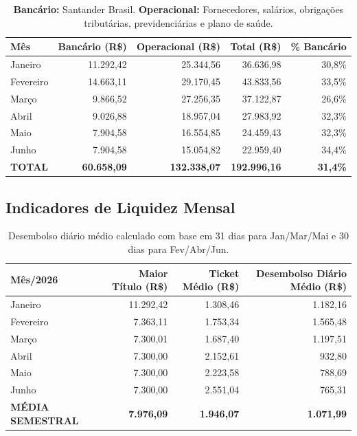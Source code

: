 \documentclass[12pt, a4paper]{article}
\begin{document}
\begin{table}[H]
    \centering
    \renewcommand{\arraystretch}{1.4}
    \begin{tabularx}{\textwidth}{X r r r r}
        \toprule
        \rowcolor{tableHeader} \textbf{Mês} & \textbf{Bancário (R\$)} & \textbf{Operacional (R\$)} & \textbf{Total (R\$)} & \textbf{\% Bancário} \\
        \midrule
        Janeiro & 11.292,42 & 25.344,56 & 36.636,98 & 30,8\% \\
        Fevereiro & 14.663,11 & 29.170,45 & 43.833,56 & 33,5\% \\
        Março & 9.866,52 & 27.256,35 & 37.122,87 & 26,6\% \\
        Abril & 9.026,88 & 18.957,04 & 27.983,92 & 32,3\% \\
        Maio & 7.904,58 & 16.554,85 & 24.459,43 & 32,3\% \\
        Junho & 7.904,58 & 15.054,82 & 22.959,40 & 34,4\% \\
        \midrule
        \rowcolor{lightGray} \textbf{TOTAL} & \textbf{60.658,09} & \textbf{132.338,07} & \textbf{192.996,16} & \textbf{31,4\%} \\
        \bottomrule
    \end{tabularx}
    \caption*{\footnotesize \textbf{Bancário:} Santander Brasil. \textbf{Operacional:} Fornecedores, salários, obrigações tributárias, previdenciárias e plano de saúde.}
\end{table}

\subsection{Indicadores de Liquidez Mensal}

\begin{table}[H]
    \centering
    \renewcommand{\arraystretch}{1.4}
    \begin{tabularx}{\textwidth}{X r r r}
        \toprule
        \rowcolor{tableHeader} \textbf{Mês/2026} & \textbf{Maior Título (R\$)} & \textbf{Ticket Médio (R\$)} & \textbf{Desembolso Diário Médio (R\$)} \\
        \midrule
        Janeiro & 11.292,42 & 1.308,46 & 1.182,16 \\
        Fevereiro & 7.363,11 & 1.753,34 & 1.565,48 \\
        Março & 7.300,01 & 1.687,40 & 1.197,51 \\
        Abril & 7.300,00 & 2.152,61 & 932,80 \\
        Maio & 7.300,00 & 2.223,58 & 788,69 \\
        Junho & 7.300,00 & 2.551,04 & 765,31 \\
        \midrule
        \rowcolor{lightGray} \textbf{MÉDIA SEMESTRAL} & \textbf{7.976,09} & \textbf{1.946,07} & \textbf{1.071,99} \\
        \bottomrule
    \end{tabularx}
    \caption*{\footnotesize Desembolso diário médio calculado com base em 31 dias para Jan/Mar/Mai e 30 dias para Fev/Abr/Jun.}
\end{table}
\end{document}
